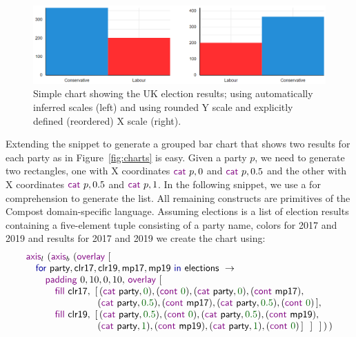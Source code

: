 \documentclass{jfp}
\newcommand{\num}[1]{\textcolor{numclr}{#1}}
\newcommand{\ident}[1]{\textnormal{\textcolor{idclr}{\sffamily #1}}}
\newcommand{\kvd}[1]{\textnormal{\textcolor{kvdclr}{\sffamily #1}}}
\newcommand{\fkvd}[1]{\textnormal{\textcolor{fkvdclr}{\sffamily #1}}}
\begin{document}
\begin{figure}
  \includegraphics[scale=0.57]{figures/simple}
  \vspace{0.25em}
  \caption{Simple chart showing the UK election results; using automatically inferred scales (left)
    and using rounded Y scale and explicitly defined (reordered) X scale (right).}
  \label{fig:simple}
\end{figure}

Extending the snippet to generate a grouped bar chart that shows two results
for each party as in Figure~\ref{fig:charts} is easy. Given a party $p$, we need to
generate two rectangles, one with X coordinates $\kvd{cat}~p, 0$ and $\kvd{cat}~p, 0.5$
and the other with X coordinates $\kvd{cat}~p, 0.5$ and $\kvd{cat}~p, 1$.
In the following snippet, we use a \fkvd{for} comprehension to generate the list. All remaining
constructs are primitives of the Compost domain-specific language. Assuming \ident{elections} is a
list of election results containing a five-element tuple consisting of a party name, colors for
2017 and 2019 and results for 2017 and 2019 we create the chart using:
%
\begin{equation*}
\begin{array}{l}
  \kvd{axis}_l~(\kvd{axis}_b~(\kvd{overlay}~[\\
  \quad \fkvd{for}~\ident{party}, \ident{clr17}, \ident{clr19}, \ident{mp17}, \ident{mp19}~\fkvd{in}~\ident{elections}~\rightarrow\\
  \quad\quad \kvd{padding}~0,10,0,10,\,\kvd{overlay}~[\\
  \quad\quad\quad \kvd{fill}~\ident{clr17},~[\,(\kvd{cat}~\ident{party}, \num{0}), (\kvd{cont}~\num{0}), (\kvd{cat}~\ident{party}, \num{0}), (\kvd{cont}~\ident{mp17}),\\
  \quad\quad\quad \hspace{4.08em}           ~(\kvd{cat}~\ident{party}, \num{0.5}), (\kvd{cont}~\ident{mp17}), (\kvd{cat}~\ident{party}, \num{0.5}), (\kvd{cont}~\num{0}) \,], \\
  \quad\quad\quad \kvd{fill}~\ident{clr19},~[\,(\kvd{cat}~\ident{party}, \num{0.5}), (\kvd{cont}~\num{0}), (\kvd{cat}~\ident{party}, \num{0.5}), (\kvd{cont}~\ident{mp19}),\\
  \quad\quad\quad \hspace{4.08em}           ~(\kvd{cat}~\ident{party}, \num{1}), (\kvd{cont}~\ident{mp19}), (\kvd{cat}~\ident{party}, \num{1}), (\kvd{cont}~\num{0})\,]~~]~~]\,)\,)\\
\end{array}
\end{equation*}
\end{document}
